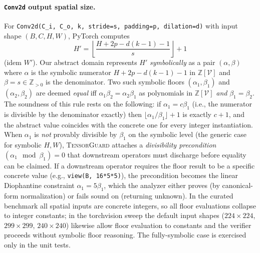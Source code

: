 \documentclass{article}
\theoremstyle{definition}
\begin{document}
\paragraph{\texttt{Conv2d} output spatial size.} For
\verb|Conv2d(C_i, C_o, k, stride=s, padding=p, dilation=d)| with
input shape $(B, C, H, W)$, PyTorch computes
\[ H' = \left\lfloor \frac{H + 2p - d(k-1) - 1}{s} \right\rfloor + 1 \]
(idem $W'$). Our abstract domain represents $H'$
\emph{symbolically} as a pair $(\alpha, \beta)$ where $\alpha$ is
the symbolic numerator $H + 2p - d(k-1) - 1$ in
$\mathbb{Z}[\mathcal V]$ and $\beta = s \in \mathbb{Z}_{>0}$ is the
denominator. Two such symbolic floors $(\alpha_1, \beta_1)$ and
$(\alpha_2, \beta_2)$ are deemed \emph{equal} iff
$\alpha_1 \beta_2 = \alpha_2 \beta_1$ as polynomials in
$\mathbb{Z}[\mathcal V]$ \emph{and} $\beta_1 = \beta_2$. The
soundness of this rule rests on the following: if $\alpha_1 = c
\beta_1$ (i.e., the numerator is divisible by the denominator
exactly) then $\lfloor \alpha_1 / \beta_1 \rfloor + 1$ is exactly
$c + 1$, and the abstract value coincides with the concrete one for
every integer instantiation. When $\alpha_1$ is \emph{not}
provably divisible by $\beta_1$ on the symbolic level (the
generic case for symbolic $H, W$), \textsc{TensorGuard} attaches
a \emph{divisibility precondition}
$(\alpha_1 \mod \beta_1) = 0$ that downstream operators must
discharge before equality can be claimed. If a downstream operator
requires the floor result to be a specific concrete value (e.g.,
\verb|view(B, 16*5*5)|), the precondition becomes the
linear Diophantine constraint $\alpha_1 = 5 \beta_1$, which the
analyzer either proves (by canonical-form normalization) or fails
sound on (returning \textsf{unknown}). In the curated benchmark
all spatial inputs are concrete integers, so all floor evaluations
collapse to integer constants; in the torchvision sweep the
default input shapes ($224\times 224$, $299\times 299$,
$240\times 240$) likewise allow floor evaluation to constants and
the verifier proceeds without symbolic floor reasoning. The
fully-symbolic case is exercised only in the unit tests.
\end{document}
